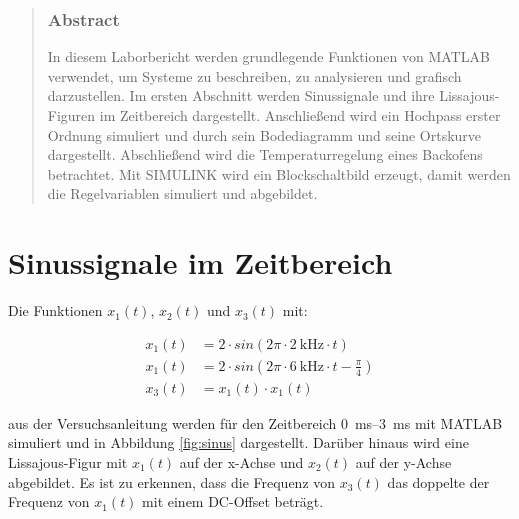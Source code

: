 \documentclass[
    paper=a4,
    fontsize=10pt,
    DIV=13,
    oneside,
]{scrartcl}
\date{\today}
\begin{document}
\maketitle


\begin{abstract}
    \noindent    
    \subsubsection*{Abstract}
        In diesem Laborbericht werden grundlegende Funktionen von MATLAB verwendet, um Systeme zu beschreiben, zu analysieren und grafisch darzustellen. Im ersten Abschnitt werden    Sinussignale und ihre Lissajous-Figuren im Zeitbereich dargestellt. Anschließend wird ein Hochpass erster Ordnung simuliert und durch sein Bodediagramm und seine Ortskurve dargestellt. Abschließend wird die Temperaturregelung eines Backofens betrachtet. Mit SIMULINK wird ein Blockschaltbild erzeugt, damit werden die Regelvariablen simuliert und abgebildet.
\end{abstract}


\section{Sinussignale im Zeitbereich}
    Die Funktionen \(x_1(t)\), \(x_2(t)\) und \(x_3(t)\) mit:

    \begin{align}
        x_1(t) &= 2 \cdot sin(2\pi \cdot \SI{2}{\kilo\hertz} \cdot t)\\
        x_1(t) &= 2 \cdot sin(2\pi \cdot \SI{6}{\kilo\hertz} \cdot t - \frac{\pi}{4})\\
        x_3(t) &= x_1(t) \cdot x_1(t)
    \end{align}

    \noindent
    aus der Versuchsanleitung \cite{versuch1} werden für den Zeitbereich \SIrange{0}{3}{\milli\second} mit MATLAB simuliert und in Abbildung \ref{fig:sinus} dargestellt.
    Darüber hinaus wird eine Lissajous-Figur mit \(x_1(t)\) auf der x-Achse und \(x_2(t)\) auf der y-Achse abgebildet. 
    Es ist zu erkennen, dass die Frequenz von \(x_3(t)\) das doppelte der Frequenz von \(x_1(t)\) mit einem DC-Offset beträgt.
\end{document}
